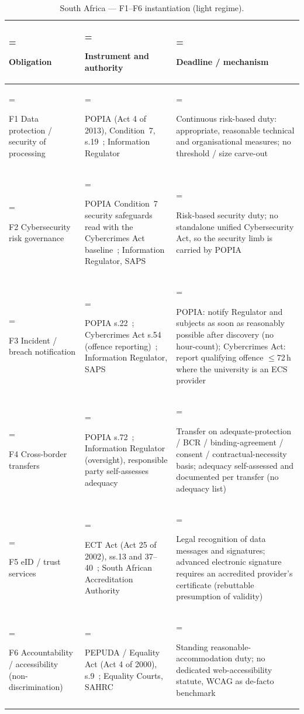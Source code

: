 \begin{table}[H]
\centering\small
\caption{South Africa --- F1--F6 instantiation (light regime).}
\label{tab:reg-za}
\renewcommand{\arraystretch}{1.25}
\begin{tabularx}{\textwidth}{%
  >{\hsize=0.40\hsize\linewidth=\hsize\bfseries\raggedright\arraybackslash}X%
  >{\hsize=1.42\hsize\linewidth=\hsize\raggedright\arraybackslash}X%
  >{\hsize=1.18\hsize\linewidth=\hsize\raggedright\arraybackslash}X%
}
\toprule
Obligation & Instrument and authority & Deadline / mechanism \\
\midrule
F1 Data protection / security of processing
  & POPIA (Act 4 of 2013), Condition~7,
    s.19~\cite{za_popia,za_inforegulator}; Information Regulator
  & Continuous risk-based duty: appropriate, reasonable technical and
    organisational measures; no threshold / size carve-out \\
F2 Cybersecurity risk governance
  & POPIA Condition~7 security safeguards read with the Cybercrimes
    Act baseline~\cite{za_popia,za_cybercrimes}; Information Regulator,
    SAPS
  & Risk-based security duty; no standalone unified Cybersecurity Act,
    so the security limb is carried by POPIA \\
F3 Incident / breach notification
  & POPIA s.22~\cite{za_popia}; Cybercrimes Act s.54
    (offence reporting)~\cite{za_cybercrimes}; Information Regulator,
    SAPS
  & POPIA: notify Regulator and subjects as soon as reasonably
    possible after discovery (no hour-count); Cybercrimes Act: report
    qualifying offence $\le$72\,h where the university is an ECS provider \\
F4 Cross-border transfers
  & POPIA s.72~\cite{za_popia,za_inforegulator}; Information Regulator
    (oversight), responsible party self-assesses adequacy
  & Transfer on adequate-protection / BCR / binding-agreement /
    consent / contractual-necessity basis; adequacy self-assessed and
    documented per transfer (no adequacy list) \\
F5 eID / trust services
  & ECT Act (Act 25 of 2002), ss.13 and
    37--40~\cite{za_ect_act}; South African Accreditation Authority
  & Legal recognition of data messages and signatures; advanced
    electronic signature requires an accredited provider's certificate
    (rebuttable presumption of validity) \\
F6 Accountability / accessibility (non-discrimination)
  & PEPUDA / Equality Act (Act 4 of 2000), s.9~\cite{za_pepuda};
    Equality Courts, SAHRC
  & Standing reasonable-accommodation duty; no dedicated
    web-accessibility statute, WCAG as de-facto benchmark \\
\bottomrule
\end{tabularx}
\end{table}

